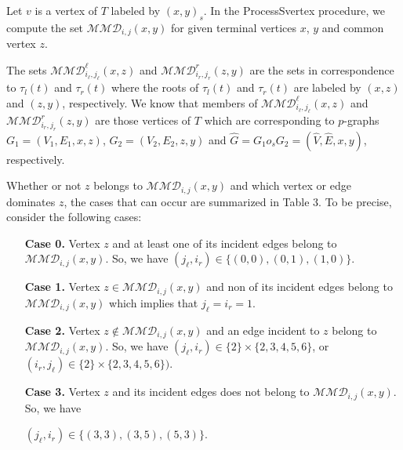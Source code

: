 \documentclass[12pt]{article}
\theoremstyle{definition}
\theoremstyle{remark}
\begin{document}
Let $v$ is a vertex of $T$  labeled by $(x,y)_s$. In the ProcessSvertex procedure, we compute the set $\mathcal{MMD}_{i,j}(x,y)$ 
for given terminal vertices $x$, $y$ and common vertex $z$.

The sets $\mathcal{MMD}_{i_\ell,j_\ell}^\ell(x,z)$ and $\mathcal{MMD}_{i_r,j_r}^r(z,y)$ are the sets in correspondence to  $\tau_l(t)$ and $\tau_r(t)$ where the roots of $\tau_l(t)$ and $\tau_r(t)$ are labeled by $(x,z)$ and $(z,y)$, respectively.
We know that members of  $\mathcal{MMD}_{i_\ell,j_\ell}^\ell(x,z)$ and $\mathcal{MMD}_{i_r,j_r}^r(z,y)$  are those vertices of $T$ which are corresponding to $p$-graphs $G_1=(V_1,E_1,x,z)$, $G_2=(V_2,E_2,z,y)$ and $\hat{G}=G_1o_s G_2=(\hat{V},\hat{E},x,y)$, respectively.

Whether or not $z$ belongs to $\mathcal{MMD}_{i,j}(x,y)$ and which vertex or edge dominates $z$, the cases that can occur are summarized in Table 3. To be precise, consider the following cases:


\begin{itemize}
	\item[\textbf{Case 0.}]
	Vertex $z$ and at least one of its incident edges belong to $\mathcal{MMD}_{i,j}(x,y)$. So, we have   $(j_{\ell},i_r)\in \{(0,0),(0,1),(1,0)\}$.	
	\item[\textbf{Case 1.}]
	Vertex $z \in \mathcal{MMD}_{i,j}(x,y)$ and non of its incident edges belong to   $\mathcal{MMD}_{i,j}(x,y)$  which implies that $j_{\ell}=i_r=1$.	
	\item[\textbf{Case 2.}]
	Vertex $z \notin \mathcal{MMD}_{i,j}(x,y)$ and  an edge incident to $z$ belong to $\mathcal{MMD}_{i,j}(x,y)$. So, we have  $(j_\ell, i_r)\in \{2\}\times\{2,3,4,5,6\}$,  or $(i_r,j_\ell)\in \{2\}\times\{2,3,4,5,6\})$.
	\item[\textbf{Case 3.}]
	Vertex $z$ and  its incident edges does  not belong to $\mathcal{MMD}_{i,j}(x,y)$. So, we have 
	
	  $(j_\ell,i_r)\in\{(3,3),(3,5),(5,3)\}$. 	
\end{itemize}
\end{document}
